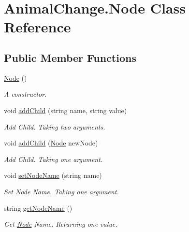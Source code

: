 \hypertarget{class_animal_change_1_1_node}{}\section{Animal\+Change.\+Node Class Reference}
\label{class_animal_change_1_1_node}
\subsection*{Public Member Functions}
\begin{DoxyCompactItemize}
\item 
\mbox{\hyperlink{class_animal_change_1_1_node_ab61b9908056398b7dbae90ef77d79f95}{Node}} ()
\begin{DoxyCompactList}\small\item\em A constructor. \end{DoxyCompactList}\item 
void \mbox{\hyperlink{class_animal_change_1_1_node_afa898ee369ed1ead4ecd6f880e3744d8}{add\+Child}} (string name, string value)
\begin{DoxyCompactList}\small\item\em Add Child. Taking two arguments. \end{DoxyCompactList}\item 
void \mbox{\hyperlink{class_animal_change_1_1_node_ac38160caf74e60731c7f92abf8d62388}{add\+Child}} (\mbox{\hyperlink{class_animal_change_1_1_node}{Node}} new\+Node)
\begin{DoxyCompactList}\small\item\em Add Child. Taking one argument. \end{DoxyCompactList}\item 
void \mbox{\hyperlink{class_animal_change_1_1_node_ae8b113588ec6ba334170ee22418950ec}{set\+Node\+Name}} (string name)
\begin{DoxyCompactList}\small\item\em Set \mbox{\hyperlink{class_animal_change_1_1_node}{Node}} Name. Taking one argument. \end{DoxyCompactList}\item 
string \mbox{\hyperlink{class_animal_change_1_1_node_a39ca6b489b5af18b35f6bdd28c2aef6d}{get\+Node\+Name}} ()
\begin{DoxyCompactList}\small\item\em Get \mbox{\hyperlink{class_animal_change_1_1_node}{Node}} Name. Returning one value. \end{DoxyCompactList}\item 

\end{DoxyCompactItemize}
